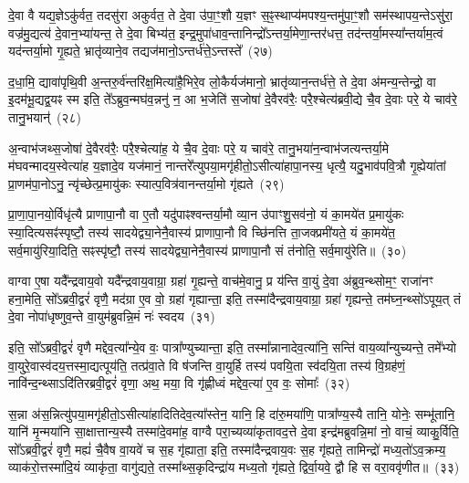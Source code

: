 {\anuvakamend[{माध्य॑न्दिनम॒ष्टाव॑ष्टावे॒ष मन॑स्त्वा प॒र्जन्यो॒\-ऽमुष्य॒ पुरु॑षो॒ द्वे च॑}]}

दे॒वा वै यद्य॒ज्ञे\-ऽकु॑र्वत॒ तदसु॑रा अकुर्वत॒ ते दे॒वा उ॑पा॒ꣳ॒शौ य॒ज्ञꣳ स॒ꣴ॒स्थाप्य॑मपश्य॒न्तमु॑पा॒ꣳ॒शौ सम॑स्थापय॒न्ते\-ऽसु॑रा॒ वज्र॑मु॒द्यत्य॑ दे॒वान॒भ्या॑यन्त॒ ते दे॒वा बिभ्य॑त॒ इन्द्र॒मुपा॑धाव॒न्तानिन्द्रो᳚\-ऽन्तर्या॒मेणा॒न्तर॑धत्त॒ तद॑न्तर्या॒मस्या᳚न्तर्याम॒त्वं यद॑न्तर्या॒मो गृ॒ह्यते॒ भ्रातृ॑व्याने॒व तद्यज॑मानो॒\-ऽन्तर्ध॑त्ते॒\-ऽन्तस्ते᳚~(२७)\ip

द॒धा॒मि॒ द्यावा॑\-पृथि॒वी अ॒न्तरु॒र्व॑न्तरि॑क्ष॒मित्या॑है॒भिरे॒व लो॒कैर्यज॑मानो॒ भ्रातृ॑व्यान॒न्तर्ध॑त्ते॒ ते दे॒वा अ॑मन्य॒न्तेन्द्रो॒ वा इ॒दम॑भू॒द्यद्व॒यꣴ स्म इति॒ ते᳚\-ऽब्रुव॒न्मघ॑व॒न्ननु॑ न॒ आ भ॒जेति॑ स॒जोषा॑ दे॒वैरव॑रैः॒ परै॒श्चेत्य॑ब्रवी॒द्ये चै॒व दे॒वाः परे॒ ये चाव॑रे॒ तानु॒भयान्॑~(२८)\ip

अ॒न्वाभ॑जथ्स॒जोषा॑ दे॒वैरव॑रैः॒ परै॒श्चेत्या॑ह॒ ये चै॒व दे॒वाः परे॒ य चाव॑रे॒ तानु॒भया॑न॒न्वाभ॑जत्यन्तर्या॒मे म॑घवन्मादय॒स्वेत्या॑ह य॒ज्ञादे॒व यज॑मानं॒ नान्तरे᳚त्युपया॒मगृ॑हीतो॒\-ऽसीत्या॑हापा॒नस्य॒ धृत्यै॒ यदु॒भाव॑पवि॒त्रौ गृ॒ह्येया॑तां प्रा॒णम॑पा॒नो\-ऽनु॒ न्यृ॑च्छेत्प्र॒मायु॑कः स्यात्प॒वित्र॑वानन्तर्या॒मो गृ॑ह्यते~(२९)\ip

प्रा॒णा॒पा॒नयो॒र्विधृ॑त्यै प्राणापा॒नौ वा ए॒तौ यदु॑पाꣴश्वन्तर्या॒मौ व्या॒न उ॑पाꣳशु॒सव॑नो॒ यं का॒मये॑त प्र॒मायु॑कः स्या॒दित्यसꣴ॑स्पृष्टौ॒ तस्य॑ सादयेद्व्या॒नेनै॒वास्य॑ प्राणापा॒नौ वि च्छि॑नत्ति ता॒जक्प्रमी॑यते॒ यं का॒मये॑त॒ सर्व॒मायु॑रिया॒दिति॒ सꣴस्पृ॑ष्टौ॒ तस्य॑ सादयेद्व्या॒नेनै॒वास्य॑ प्राणापा॒नौ सं त॑नोति॒ सर्व॒मायु॑रेति॥~(३०)\ip

{\anuvakamend[{त॒ उ॒भया᳚न्गृह्यते॒ चतु॑श्चत्वारिꣳशच्च}]}

वाग्वा ए॒षा यदै᳚न्द्रवाय॒वो यदै᳚न्द्रवाय॒वाग्रा॒ ग्रहा॑ गृ॒ह्यन्ते॒ वाच॑मे॒वानु॒ प्र य॑न्ति वा॒युं दे॒वा अ॑ब्रुव॒न्थ्सोम॒ꣳ॒ राजा॑नꣳ हना॒मेति॒ सो᳚\-ऽब्रवी॒द्वरं॑ वृणै॒ मद॑ग्रा ए॒व वो॒ ग्रहा॑ गृह्यान्ता॒ इति॒ तस्मा॑दैन्द्रवाय॒वाग्रा॒ ग्रहा॑ गृह्यन्ते॒ तम॑घ्न॒न्थ्सो॑\-ऽपूय॒त् तं दे॒वा नोपा॑धृष्णुव॒न्ते वा॒युम॑ब्रुवन्नि॒मं नः॑ स्वदय~(३१)\ip

इति॒ सो᳚\-ऽब्रवी॒द्वरं॑ वृणै मद्देव॒त्या᳚न्ये॒व वः॒ पात्रा᳚ण्युच्यान्ता॒ इति॒ तस्मा᳚न्नानादेव॒त्या॑नि॒ सन्ति॑ वाय॒व्या᳚न्युच्यन्ते॒ तमे᳚भ्यो वा॒युरे॒वास्व॑दय॒त्तस्मा॒द्यत्पूय॑ति॒ तत्प्र॑वा॒ते वि ष॑जन्ति वा॒युर्\mbox{}हि तस्य॑ पवयि॒ता स्व॑दयि॒ता तस्य॑ वि॒ग्रह॑णं॒ नावि॑न्द॒न्थ्सा\-ऽदि॑तिरब्रवी॒द्वरं॑ वृणा॒ अथ॒ मया॒ वि गृ॑ह्णीध्वं मद्देव॒त्या॑ ए॒व वः॒ सोमाः᳚~(३२)\ip

स॒न्ना अ॑स॒न्नित्यु॑पया॒मगृ॑हीतो॒\-ऽसीत्या॑हादितिदेव॒त्या᳚स्तेन॒ यानि॒ हि दा॑रु॒मया॑णि॒ पात्रा᳚ण्य॒स्यै तानि॒ योनेः॒ सम्भू॑तानि॒ यानि॑ मृ॒न्मया॑नि सा॒क्षात्तान्य॒स्यै तस्मा॑दे॒वमा॑ह॒ वाग्वै परा॒च्यव्या॑कृतावद॒त्ते दे॒वा इन्द्र॑मब्रुवन्नि॒मां नो॒ वाचं॒ व्याकु॒र्विति॒ सो᳚\-ऽब्रवी॒द्वरं॑ वृणै॒ मह्यं॑ चै॒वैष वा॒यवे॑ च स॒ह गृ॑ह्याता॒ इति॒ तस्मा॑दैन्द्रवाय॒वः स॒ह गृ॑ह्यते॒ तामिन्द्रो॑ मध्य॒तो॑\-ऽव॒क्रम्य॒ व्याक॑रो॒त्तस्मा॑दि॒यं व्याकृ॑ता॒ वागु॑द्यते॒ तस्मा᳚थ्स॒कृदिन्द्रा॑य मध्य॒तो गृ॑ह्यते॒ द्विर्वा॒यवे॒ द्वौ हि स वरा॒ववृ॑णीत॥~(३३)\ip

